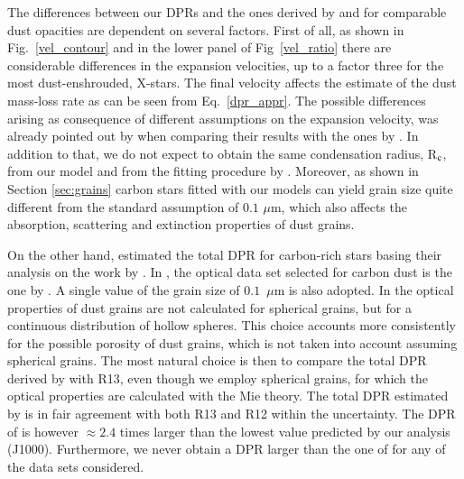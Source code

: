 \documentclass[useAMS,usenatbib]{mn2e/mn2e}
\begin{document}
{The differences between our DPRs and the ones derived by \citet{Boyer12} and \citet{Srinivasan16} for comparable dust opacities are dependent on several factors. First of all, as shown in Fig.~\ref{vel_contour} and in the lower panel of Fig~\ref{vel_ratio} there are considerable differences in the expansion velocities, up to a factor three for the most dust-enshrouded, X-stars. 
The final velocity affects the estimate of the dust mass-loss rate as can be seen from Eq.~\ref{dpr_appr}. 
The possible differences arising as consequence of different assumptions on the expansion velocity, was already pointed out by \citet{Srinivasan16} when comparing their results with the ones by \citet{Matsuura13}.
In addition to that, we do not expect to obtain the same condensation radius, R$_{\rm c}$, from our model and from the fitting procedure by \citet{Srinivasan16}. 
Moreover, as shown in Section \ref{sec:grains} carbon stars fitted with our models can yield grain size quite different from the standard assumption of $0.1$ $\mu$m, which also affects the absorption, scattering and extinction properties of dust grains.

On the other hand, \citet{Matsuura13} estimated the total DPR for carbon-rich stars basing their analysis on the work by \citet{Groenewegen09}. 
In \citet{Groenewegen09}, the optical data set selected for carbon dust is the one by \citet{Rouleau91}. A single value of the grain size of $0.1$~$\mu$m is also adopted. In \citet{Groenewegen09} the optical properties of dust grains are not calculated for spherical grains, but for a continuous distribution of hollow spheres. This choice accounts more consistently for the possible porosity of dust grains, which is not taken into account assuming spherical grains.
The most natural choice is then to compare the total DPR derived by \citet{Matsuura13} with R13, even though we employ spherical grains, for which the optical properties are calculated with the Mie theory.
The total DPR estimated by \citet{Matsuura13} is in fair agreement with {\rm both} R13 and R12 within the uncertainty.
The DPR of \citet{Matsuura13} is however $\approx2.4$ times larger than the lowest value predicted by our analysis (J1000). Furthermore, we never obtain a DPR larger than the one of \citet{Matsuura13} for any of the data sets considered.
        
}
\end{document}

